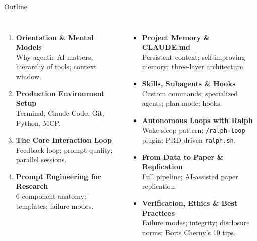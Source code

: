 \documentclass[aspectratio=169,10pt]{beamer}
\begin{document}
\begin{frame}{Outline}
\small
\begin{columns}[T]
\begin{enumerate}
    \item \textbf{Orientation \& Mental Models}\\
    {\scriptsize Why agentic AI matters; hierarchy of tools; context window.}
    \vspace{0.15em}
    \item \textbf{Production Environment Setup}\\
    {\scriptsize Terminal, Claude Code, Git, Python, MCP.}
    \vspace{0.15em}
    \item \textbf{The Core Interaction Loop}\\
    {\scriptsize Feedback loop; prompt quality; parallel sessions.}
    \vspace{0.15em}
    \item \textbf{Prompt Engineering for Research}\\
    {\scriptsize 6-component anatomy; templates; failure modes.}
\end{enumerate}

\begin{itemize}
    \item[\textbf{5.}] \textbf{Project Memory \& CLAUDE.md}\\
    {\scriptsize Persistent context; self-improving memory; three-layer architecture.}
    \vspace{0.1em}
    \item[\textbf{6.}] \textbf{Skills, Subagents \& Hooks}\\
    {\scriptsize Custom commands; specialized agents; plan mode; hooks.}
    \vspace{0.1em}
    \item[\textbf{7.}] \textbf{Autonomous Loops with Ralph}\\
    {\scriptsize Wake-sleep pattern; \texttt{/ralph-loop} plugin; PRD-driven \texttt{ralph.sh}.}
    \vspace{0.1em}
    \item[\textbf{8.}] \textbf{From Data to Paper \& Replication}\\
    {\scriptsize Full pipeline; AI-assisted paper replication.}
    \vspace{0.1em}
    \item[\textbf{9.}] \textbf{Verification, Ethics \& Best Practices}\\
    {\scriptsize Failure modes; integrity; disclosure norms; Boris Cherny's 10 tips.}
\end{itemize}
\end{columns}
\end{frame}
\end{document}
